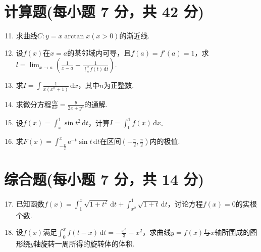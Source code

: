 \documentclass[../Main.tex]{subfiles}
\begin{document}
\section{计算题(每小题 7 分，共 42 分)}
\begin{enumerate}
    \setcounter{enumi}{10}
    \item 求曲线$C:y=x\arctan x(x>0)$的渐近线.
          \vspace{12em}

    \item 设$f(x)$在$x=a$的某邻域内可导，且$f(a)=f'(a)=1$，求$l=\lim_{x\to a}
              \left(\frac{1}{x-a}-\frac{1}{\displaystyle\int_{a}^{x}f(t)\,\mathrm{d}t}\right
              )$.
          \vspace{11em}

    \item 求$I=\int\frac{1}{x(x^{n}+1)}\,\mathrm{d}x$，其中$n$为正整数.
          \vspace{11em}

    \item 求微分方程$\frac{\mathrm{d}y}{\mathrm{d}x}=\frac{y}{2x+y^{4}}$的通解.
          \vspace{11em}

    \item 设$f(x)=\int_{x}^{1}\sin t^{2}\,\mathrm{d}t$，计算$I=\int_{0}^{1}f(x
              )\,\mathrm{d}x$.
          \vspace{12em}

    \item 求$F(x)=\int_{-\frac{\pi}{2}}^{x}\mathrm{e}^{-t}\sin t\,\mathrm{d}t$在区间$\left
              (-\frac{\pi}{2},\frac{\pi}{2}\right)$内的极值.
          \vspace{12em}
\end{enumerate}

\section{综合题(每小题 7 分，共 14 分)}
\begin{enumerate}
    \setcounter{enumi}{16}
    \item 已知函数$f(x)=\int_{1}^{x}\sqrt{1+t^{2}}\,\mathrm{d}t+\int_{x^2}^{1}
              \sqrt{1+t}\,\mathrm{d}t$，讨论方程$f(x)=0$的实根个数.
          \vspace{12em}

    \item 设$f(x)$满足$\int_{0}^{x}f(t-x)\,\mathrm{d}t=-\frac{x^{3}}{3}-x^{2}$，求曲线$y
              =f(x)$与$x$轴所围成的图形绕$y$轴旋转一周所得的旋转体的体积.
          \vspace{13em}
\end{enumerate}
\end{document}
